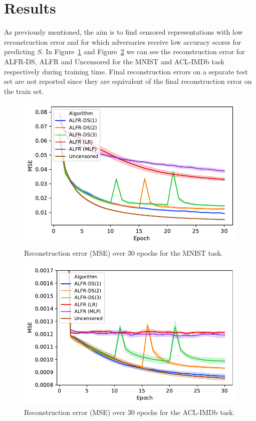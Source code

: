 \documentclass[nohyperref]{article}
\theoremstyle{plain}
\theoremstyle{definition}
\theoremstyle{remark}
\begin{document}
\section{Results}
\label{results}
As previously mentioned, the aim is to find censored representations with low reconstruction error and for which adversaries receive low accuracy scores for predicting $S$. In Figure~\ref{loss_mnist} and Figure~\ref{loss_imdb} we can see the reconstruction error for ALFR-DS, ALFR and Uncensored for the MNIST and ACL-IMDb task respectively during training time. Final reconstruction errors on a separate test set are not reported since they are equivalent of the final reconstruction error on the train set.
\begin{figure}[ht]
\vskip 0.2in
\begin{center}
\centerline{\includegraphics[width=\columnwidth]{mnist_loss}}
\caption{Reconstruction error (MSE) over 30 epochs for the MNIST task.}
\label{loss_mnist}
\end{center}
\vskip -0.2in
\end{figure}
\begin{figure}[ht]
\vskip 0.2in
\begin{center}
\centerline{\includegraphics[width=\columnwidth]{imdb_loss}}
\caption{Reconstruction error (MSE) over 30 epochs for the ACL-IMDb task.}
\label{loss_imdb}
\end{center}
\vskip -0.2in
\end{figure}
\end{document}
